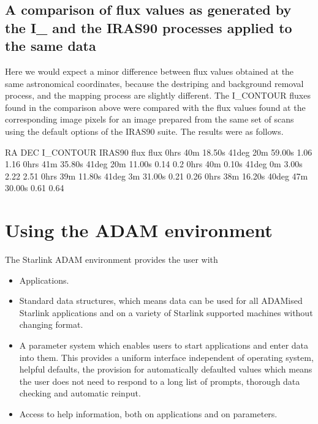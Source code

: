 \documentclass[twoside,11pt]{starlink}
\begin{document}
\subsection{A comparison of flux values as generated by the I\_ and the IRAS90
processes applied to the same data}
Here we would expect a minor difference between flux values obtained at the
same astronomical coordinates, because the destriping and background removal
process, and the mapping process are slightly different.
The I\_CONTOUR fluxes found in the comparison above were compared with the flux
values found at the corresponding image pixels for an image prepared  from the
same set of scans using the default options of the IRAS90 suite. The results
were as follows.
\begin{small}
\begin{terminalv}
      RA                  DEC              I_CONTOUR      IRAS90
                                             flux          flux
 0hrs 40m 18.50s     41deg 20m 59.00s        1.06          1.16
 0hrs 41m 35.80s     41deg 20m 11.00s        0.14          0.2
 0hrs 40m  0.10s     41deg  0m  3.00s        2.22          2.51
 0hrs 39m 11.80s     41deg  3m 31.00s        0.21          0.26
 0hrs 38m 16.20s     40deg 47m 30.00s        0.61          0.64
\end{terminalv}
\end{small}

\section{Using the ADAM environment
\label{m:useadam}}

The Starlink ADAM environment provides the user with
\begin{itemize}
\item Applications.
\item Standard data structures, which means data can be used for all
ADAMised Starlink applications and on a variety of Starlink supported machines
without changing format.
\item A parameter system which enables users to start applications and enter
data into them. This provides a uniform interface independent of operating
system, helpful defaults, the provision for automatically defaulted values which
means the user does not need to respond to a long list of prompts, thorough data
checking and automatic reinput.
\item Access to help information, both on applications and on parameters.
\end{itemize}
\end{document}
